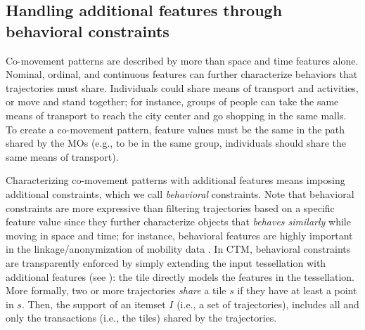 \documentclass[preprint,12pt,authoryear]{elsarticle} %
\newcommand{\mf}[1]{#1}
\newcommand{\mfc}[2]{\mf{#1} {\color{red}{\textit{#2}}}}
\begin{document}
\subsection{Handling additional features through behavioral constraints}
\label{sec:constr}
Co-movement patterns are described by more than space and time features alone.
Nominal, ordinal, and continuous features can further characterize behaviors that trajectories must share.
Individuals could share means of transport and activities, or move and stand together; for instance, groups of people can take the same means of transport to reach the city center and go shopping in the same malls.
To create a co-movement pattern, feature values must be the same in the path shared by the MOs (e.g., to be in the same group, individuals should share the same means of transport).

Characterizing co-movement patterns with additional features means imposing additional constraints, which we call \textit{behavioral} constraints. 
Note that behavioral constraints are more expressive than filtering trajectories based on a specific feature value since they further characterize objects that \textit{behaves similarly} while moving in space and time; for instance, behavioral features are highly important in the linkage/anonymization of mobility data \citep{DBLP:journals/tkde/JinHFCOZ23}.
In CTM, behavioral constraints are transparently enforced by simply extending the input tessellation with additional features (see ): the tile directly models the features in the tessellation.
More formally, two or more trajectories \textit{share} a tile $s$ if they have at least a point in $s$. Then, the support of an itemset $I$ (i.e., a set of trajectories), includes all and only the transactions (i.e., the tiles) shared by the trajectories.
\end{document}
